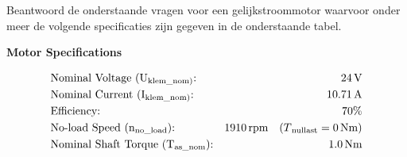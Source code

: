 Beantwoord de onderstaande vragen voor een gelijkstroommotor waarvoor onder
meer de volgende specificaties zijn gegeven in de onderstaande tabel.

\begin{center}
    \textbf{Motor Specifications}
\end{center}

\begin{align*}
    &\text{Nominal Voltage (U\textsubscript{klem\_nom)}:} & 24 \, \text{V} \\
    &\text{Nominal Current (I\textsubscript{klem\_nom)}:} & 10.71 \, \text{A} \\
    &\text{Efficiency:} & 70\% \\
    &\text{No-load Speed (n\textsubscript{no\_load}):} & 1910 \, \text{rpm} \quad (T\textsubscript{nullast} = 0 \, \text{Nm}) \\
    &\text{Nominal Shaft Torque (T\textsubscript{as\_nom}):} & 1.0 \, \text{Nm}
\end{align*}


